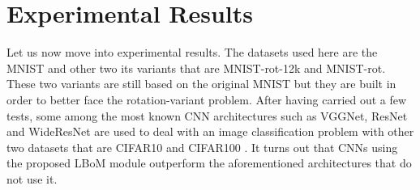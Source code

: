 \FloatBarrier
 
\section{Experimental Results}

Let us now move into experimental results. The datasets used here are the MNIST \citep{MNIST} and other two its variants that are MNIST-rot-12k and MNIST-rot. These two variants are still based on the original MNIST but they are built in order to better face the rotation-variant problem. After having carried out a few tests, some among the most known CNN architectures such as VGGNet, ResNet and WideResNet are used to deal with an image classification problem with other two datasets that are CIFAR10 \citep{CIFAR10and100} and CIFAR100 \citep{CIFAR10and100}. It turns out that CNNs using the proposed LBoM module outperform the aforementioned architectures that do not use it. 
